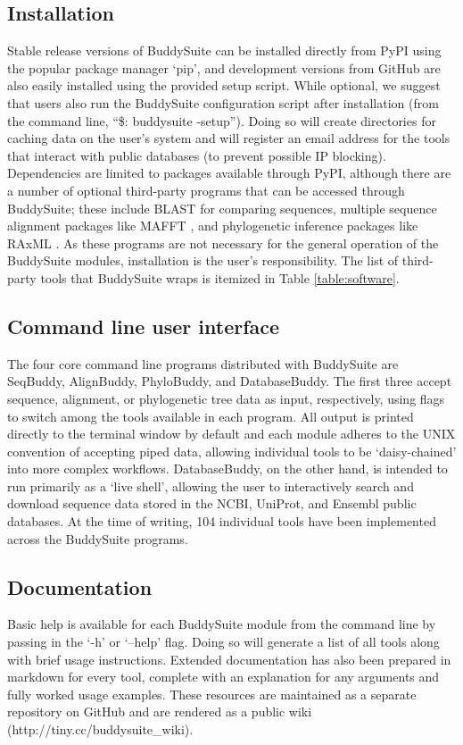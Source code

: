 \documentclass[twocolumn]{bmcart}%
\begin{document}
\subsection*{Installation}
Stable release versions of BuddySuite can be installed directly from PyPI using the popular package manager `pip', and development versions from GitHub are also easily installed using the provided setup script. While optional, we suggest that users also run the BuddySuite configuration script after installation (from the command line, ``\$: buddysuite -setup''). Doing so will create directories for caching data on the user's system and will register an email address for the tools that interact with public databases (to prevent possible IP blocking). Dependencies are limited to packages available through PyPI, although there are a number of optional third-party programs that can be accessed through BuddySuite; these include BLAST \cite{Camacho2009} for comparing sequences, multiple sequence alignment packages like MAFFT \cite{Katoh:2013hm}, and phylogenetic inference packages like RAxML \cite{Stamatakis:2006de}. As these programs are not necessary for the general operation of the BuddySuite modules, installation is the user's responsibility. The list of third-party tools that BuddySuite wraps is itemized in Table \ref{table:software}.

\subsection*{Command line user interface}
The four core command line programs distributed with BuddySuite are SeqBuddy, AlignBuddy, PhyloBuddy, and DatabaseBuddy. The first three accept sequence, alignment, or phylogenetic tree data as input, respectively, using flags to switch among the tools available in each program. All output is printed directly to the terminal window by default and each module adheres to the UNIX convention of accepting piped data, allowing individual tools to be `daisy-chained' into more complex workflows. DatabaseBuddy, on the other hand, is intended to run primarily as a `live shell', allowing the user to interactively search and download sequence data stored in the NCBI, UniProt, and Ensembl public databases. At the time of writing, 104 individual tools have been implemented across the BuddySuite programs.

\subsection*{Documentation}
Basic help is available for each BuddySuite module from the command line by passing in the `-h' or `--help' flag. Doing so will generate a list of all tools along with brief usage instructions. Extended documentation has also been prepared in markdown for every tool, complete with an explanation for any arguments and fully worked usage examples. These resources are maintained as a separate repository on GitHub and are rendered as a public wiki (http://tiny.cc/buddysuite\_wiki).
\end{document}
